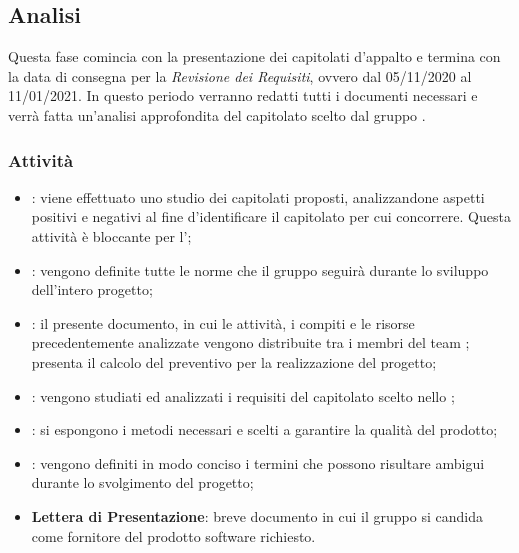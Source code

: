 \subsection{Analisi}
Questa fase comincia con la presentazione dei capitolati d'appalto e termina con la data di consegna per la \textit{Revisione dei Requisiti}, ovvero dal 05/11/2020 al 11/01/2021.
In questo periodo verranno redatti tutti i documenti necessari e verrà fatta un'analisi approfondita del capitolato scelto dal gruppo \Gruppo{}.
\subsubsection{Attività}
\begin{itemize}
\item \textbf{\SdF}: viene effettuato uno studio dei capitolati proposti, analizzandone aspetti positivi e negativi al fine d'identificare il capitolato per cui concorrere. Questa attività è bloccante per l'\textit{\AdR};
\item \textbf{\NdP}: vengono definite tutte le norme che il gruppo \Gruppo{} seguirà durante lo sviluppo dell'intero progetto;
\item \textbf{\PdP}: il presente documento, in cui le attività, i compiti\glo{} e le risorse precedentemente analizzate vengono distribuite tra i membri del team \Gruppo{}; presenta il calcolo del preventivo per la realizzazione del progetto;
\item \textbf{\AdR}: vengono studiati ed analizzati i requisiti del capitolato\glo{} scelto nello \textit{\SdF};
\item \textbf{\PdQ}: si espongono i metodi necessari e scelti a garantire la qualità del prodotto;
\item \textbf{\Glossario}: vengono definiti in modo conciso i termini che possono risultare ambigui durante lo svolgimento del progetto;
\item \textbf{Lettera di Presentazione}: breve documento in cui il gruppo \Gruppo{} si candida come fornitore del prodotto software richiesto.
\end{itemize}

